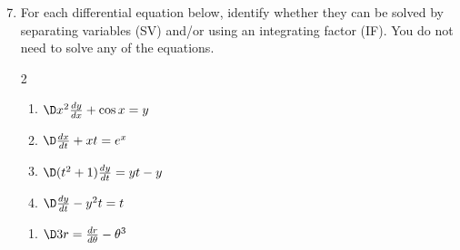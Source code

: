 \documentclass[12pt]{amsart}
\numberwithin{equation}{section}
\begin{document}
\newpage
\thispagestyle{empty}
	
\begin{enumerate}[1.]
\setcounter{enumi}{6}
\item  For each differential equation below, identify whether they can be solved by separating variables (SV) and/or using an integrating factor (IF). You do not need to solve any of the equations.
	\begin{multicols}{2}
	\begin{enumerate}
	\item  $\D x^2 \frac{dy}{dx} + \cos x = y$\\ 	%
	\vspace{6.2cm}
	\item  $\D \frac{dx}{dt} + xt = e^x$\\			%
	\vspace{6.2cm}
	\item  $\D (t^2 + 1) \frac{dy}{dt} = yt - y$\\		%
	\vspace{6.2cm}
	\item  $\D \frac{dy}{dt} - y^2 t = t$\\			%
	\vspace{6.2cm}
	\end{enumerate}
	\end{multicols}
	\begin{enumerate}
	\item[(e)]  $\D 3r = \frac{dr}{d\theta} - \theta^3$	%
	\end{enumerate}
\end{enumerate}

\newpage
\thispagestyle{empty}
\end{document}
